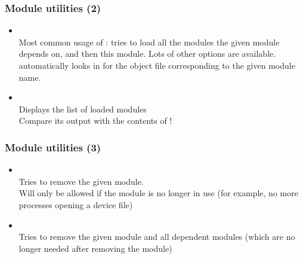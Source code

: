 \begin{frame}
  \frametitle{Module utilities (2)}
  \begin{itemize}
  \item {}\\
    Most common usage of : tries to load all the
    modules the given module depends on, and then this module. Lots of
    other options are available.  automatically looks in
     for the object file corresponding
    to the given module name.
  \item {}\\
    Displays the list of loaded modules\\
    Compare its output with the contents of !
  \end{itemize}
\end{frame}

\begin{frame}
  \frametitle{Module utilities (3)}
  \begin{itemize}
  \item {}\\
    Tries to remove the given module.\\
    Will only be allowed if the module is no longer in use (for
    example, no more processes opening a device file)
  \item {}\\
    Tries to remove the given module and all dependent modules (which
    are no longer needed after removing the module)
  \end{itemize}
\end{frame}

